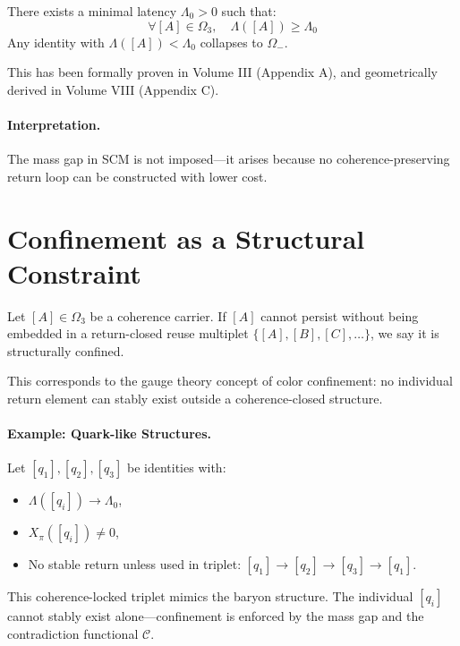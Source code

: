 \begin{definition}
There exists a minimal latency \( \Lambda_0 > 0 \) such that:
\[
\forall [A] \in \Omega_3, \quad \Lambda([A]) \ge \Lambda_0
\]
Any identity with \( \Lambda([A]) < \Lambda_0 \) collapses to \( \Omega_- \).
\end{definition}

This has been formally proven in Volume III (Appendix A), and geometrically derived in Volume VIII (Appendix C).

\paragraph{Interpretation.}
The mass gap in SCM is not imposed—it arises because no coherence-preserving return loop can be constructed with lower cost.

\section{Confinement as a Structural Constraint}

\begin{definition}
Let \( [A] \in \Omega_3 \) be a coherence carrier. If \( [A] \) cannot persist without being embedded in a return-closed reuse multiplet \( \{ [A], [B], [C], \dots \} \), we say it is structurally confined.

\end{definition}

This corresponds to the gauge theory concept of color confinement: no individual return element can stably exist outside a coherence-closed structure.

\paragraph{Example: Quark-like Structures.}
Let \( [q_1], [q_2], [q_3] \) be identities with:

\begin{itemize}
  \item \( \Lambda([q_i]) \to \Lambda_0 \),
  \item \( X_\pi([q_i]) \ne 0 \),
  \item No stable return unless used in triplet: \( [q_1] \to [q_2] \to [q_3] \to [q_1] \).
\end{itemize}

This coherence-locked triplet mimics the baryon structure. The individual \( [q_i] \) cannot stably exist alone—confinement is enforced by the mass gap and the contradiction functional \( \mathcal{C} \).


